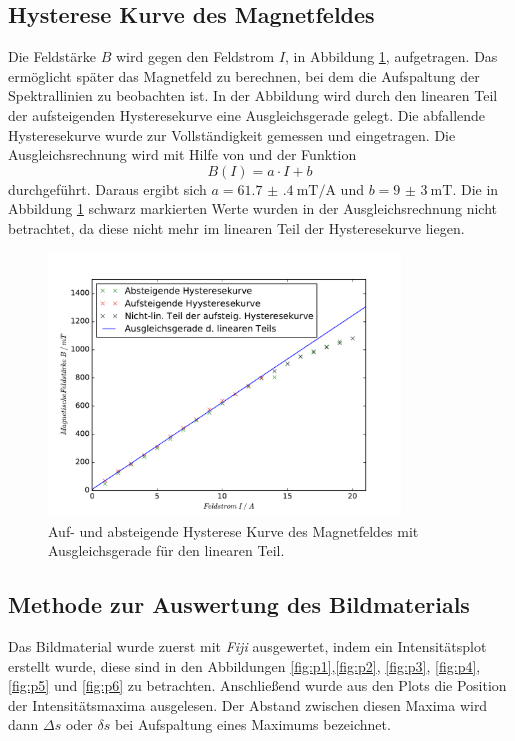 \subsection{Hysterese Kurve des Magnetfeldes}
Die Feldstärke $B$ wird gegen den Feldstrom $I$, in Abbildung \ref{fig:BFeldplot}, aufgetragen. 
Das ermöglicht später das Magnetfeld zu berechnen, bei dem die Aufspaltung der Spektrallinien 
zu beobachten ist. In der Abbildung wird durch den linearen Teil der aufsteigenden Hysteresekurve eine 
Ausgleichsgerade gelegt. Die abfallende Hysteresekurve wurde zur Vollständigkeit gemessen und 
eingetragen. Die Ausgleichsrechnung wird mit Hilfe von \cite{scipy} und der Funktion
\begin{equation*}
B\left(I\right) = a \cdot I + b
\end{equation*}
durchgeführt.  Daraus ergibt sich $ a = \SI{61.7(4)}{\milli\tesla\per\ampere}$ und 
$ b = \SI{9(3)}{\milli\tesla}$. Die in Abbildung \ref{fig:BFeldplot} schwarz markierten Werte wurden 
in der Ausgleichsrechnung nicht betrachtet, da diese nicht mehr im linearen Teil der Hysteresekurve 
liegen.
\begin{figure}
  \centering
  \includegraphics[height = 7cm]{plots/BFeldplot.pdf}
  \caption{Auf- und absteigende Hysterese Kurve des Magnetfeldes mit Ausgleichsgerade für den linearen Teil.}
   \label{fig:BFeldplot}
\end{figure}


\subsection{Methode zur Auswertung des Bildmaterials}
Das Bildmaterial wurde zuerst mit \textit{Fiji} \cite{fiji} ausgewertet, indem ein Intensitätsplot 
erstellt wurde, diese sind in den Abbildungen \ref{fig:p1},\ref{fig:p2}, \ref{fig:p3}, 
\ref{fig:p4}, \ref{fig:p5} und \ref{fig:p6} zu betrachten. Anschließend wurde aus den Plots die 
Position der Intensitätsmaxima ausgelesen. Der Abstand zwischen diesen Maxima wird dann $\Delta s$ 
oder $\delta s$ bei Aufspaltung eines Maximums bezeichnet.

